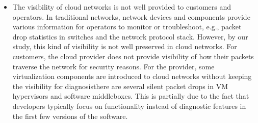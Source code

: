 \begin{itemize}
\item The visibility of cloud networks is not well provided to customers and operators. In traditional networks, network devices and components provide various information for operators to monitor or troubleshoot, e.g., packet drop statistics in switches and the network protocol stack. However, by our study, this kind of visibility is not well preserved in cloud networks. For customers, the cloud provider does not provide visibility of how their packets traverse the network for security reasons. For the provider, some virtualization components are introduced to cloud networks without keeping the visibility for diagnosis\textemdash there are several silent packet drops in VM hypervisors and software middleboxes. This is partially due to the fact that developers typically focus on functionality instead of diagnostic features in the first few versions of the software.
\end{itemize}


